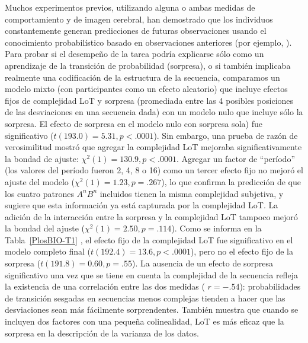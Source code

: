 Muchos experimentos previos, utilizando alguna o ambas medidas de comportamiento y de imagen cerebral, han demostrado que los individuos constantemente generan predicciones de futuras observaciones usando el conocimiento probabilístico basado en observaciones anteriores (por ejemplo, \cite{f19,f20}). Para probar si el desempeño de la tarea podría explicarse sólo como un aprendizaje de la transición de probabilidad (sorpresa), o si también implicaba realmente una codificación de la estructura de la secuencia, comparamos un modelo mixto (con participantes como un efecto aleatorio) que incluye efectos fijos de complejidad LoT y sorpresa (promediada entre las 4 posibles posiciones de las desviaciones en una secuencia dada) con un modelo nulo que incluye sólo la sorpresa. El efecto de sorpresa en el modelo nulo con sorpresa sola) fue significativo ($t(193.0) = 5.31, p < .0001$). Sin embargo, una prueba de razón de verosimilitud mostró que agregar la complejidad LoT mejoraba significativamente la bondad de ajuste: $\chi^2(1) = 130.9, p <.0001$. Agregar un factor de ``período'' (los valores del período fueron 2, 4, 8 o 16) como un tercer efecto fijo no mejoró el ajuste del modelo ($\chi^2(1) = 1.23, p =.267$), lo que confirma la predicción de que los cuatro patrones $A^n B^n$ incluidos tienen la misma complejidad subjetiva, y sugiere que esta información ya está capturada por la complejidad LoT. La adición de la interacción entre la sorpresa y la complejidad LoT tampoco mejoró la bondad del ajuste ($\chi^2(1) = 2.50, p =.114$). Como se informa en la Tabla~\ref{PlosBIO-T1} , el efecto fijo de la complejidad LoT fue significativo en el modelo completo final ($t(192.4) = 13.6, p <.0001$), pero no el efecto fijo de la sorpresa ($t ( 191.8) = 0.60, p = .55$). La ausencia de un efecto de sorpresa significativo una vez que se tiene en cuenta la complejidad de la secuencia refleja la existencia de una correlación entre las dos medidas ( $r = - . 54$): probabilidades de transición sesgadas en secuencias menos complejas tienden a hacer que las desviaciones sean más fácilmente sorprendentes. También muestra que cuando se incluyen dos factores con una pequeña colinealidad, LoT es más eficaz que la sorpresa en la descripción de la varianza de los datos.


